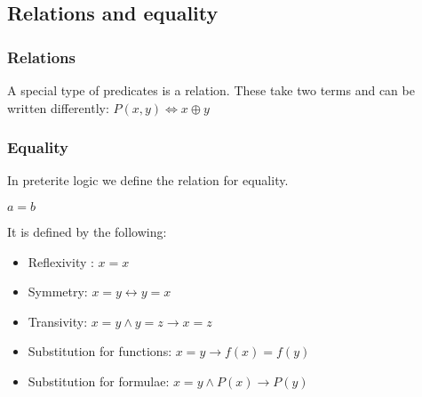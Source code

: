 
\subsection{Relations and equality}

\subsubsection{Relations}

A special type of predicates is a relation. These take two terms and can be written differently:
$P(x,y)\Leftrightarrow x\oplus y$

\subsubsection{Equality}

In preterite logic we define the relation for equality.

\(a=b\)

It is defined by the following:

\begin{itemize}
\item Reflexivity : \(x=x\)
\item Symmetry: \(x=y\leftrightarrow y=x\)
\item Transivity: \(x=y\land y=z \rightarrow x=z\)
\item Substitution for functions: \(x=y\rightarrow f(x)=f(y)\)
\item Substitution for formulae: \(x=y\land P(x)\rightarrow P(y)\)
\end{itemize}

